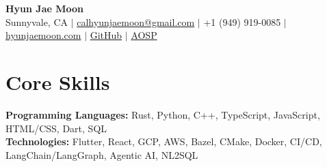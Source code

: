 \documentclass[10pt]{article}
\begin{document}
\begin{center}
    \textbf{\LARGE Hyun Jae Moon} \\ \vspace{2pt}
    \small Sunnyvale, CA $|$ \href{mailto:calhyunjaemoon@gmail.com}{calhyunjaemoon@gmail.com} $|$ +1 (949) 919-0085 $|$ \href{https://hyunjaemoon.com}{hyunjaemoon.com} $|$ \href{https://github.com/hyunjaemoon}{GitHub} $|$ \href{https://android-review.googlesource.com/q/owner:hyunjaemoon@google.com}{AOSP}
\end{center}
\vspace{-10pt}

\section{Core Skills}
\begin{itemize}[leftmargin=0.15in, label={}, itemsep=0pt, parsep=0pt]
    \small{\item[]{
        \textbf{Programming Languages:} Rust, Python, C++, TypeScript, JavaScript, HTML/CSS, Dart, SQL \\
        \textbf{Technologies:} Flutter, React, GCP, AWS, Bazel, CMake, Docker, CI/CD, LangChain/LangGraph, Agentic AI, NL2SQL
    }}
\end{itemize}

\end{document}
